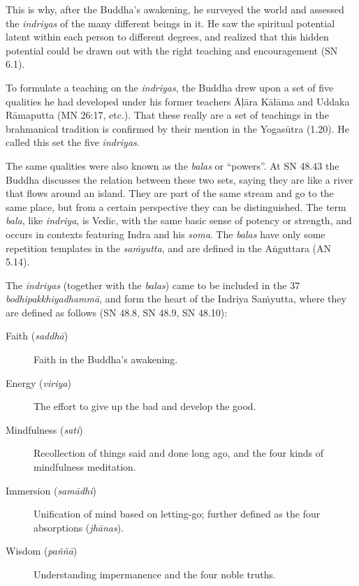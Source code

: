 \documentclass[12pt,openany]{book}%
\begin{document}
This is why, after the Buddha’s awakening, he surveyed the world and assessed the \textit{indriyas} of the many different beings in it. He saw the spiritual potential latent within each person to different degrees, and realized that this hidden potential could be drawn out with the right teaching and encouragement (SN 6.1).

To formulate a teaching on the \textit{indriyas}, the Buddha drew upon a set of five qualities he had developed under his former teachers \textsanskrit{Āḷāra} \textsanskrit{Kālāma} and Uddaka \textsanskrit{Rāmaputta} (MN 26:17, etc.). That these really are a set of teachings in the brahmanical tradition is confirmed by their mention in the \textsanskrit{Yogasūtra} (1.20). He called this set the five \textit{indriyas}.

The same qualities were also known as the \textit{balas} or “powers”. At SN 48.43 the Buddha discusses the relation between these two sets, saying they are like a river that flows around an island. They are part of the same stream and go to the same place, but from a certain perspective they can be distinguished. The term \textit{bala}, like \textit{indriya}, is Vedic, with the same basic sense of potency or strength, and occurs in contexts featuring Indra and his \textit{soma}. The \textit{balas} have only some repetition templates in the \textit{\textsanskrit{saṁyutta}}, and are defined in the \textsanskrit{Aṅguttara} (AN 5.14).

The \textit{indriyas} (together with the \textit{balas}) came to be included in the 37 \textit{\textsanskrit{bodhipakkhiyadhammā}}, and form the heart of the Indriya \textsanskrit{Saṁyutta}, where they are defined as follows (SN 48.8, SN 48.9, SN 48.10):

\begin{description}%
\item[Faith (\textit{\textsanskrit{saddhā}})] Faith in the Buddha’s awakening.%
\item[Energy (\textit{viriya})] The effort to give up the bad and develop the good.%
\item[Mindfulness (\textit{sati})] Recollection of things said and done long ago, and the four kinds of mindfulness meditation.%
\item[Immersion (\textit{\textsanskrit{samādhi}})] Unification of mind based on letting-go; further defined as the four absorptions (\textit{\textsanskrit{jhānas}}).%
\item[Wisdom (\textit{\textsanskrit{paññā}})] Understanding impermanence and the four noble truths.%
\end{description}
\end{document}
